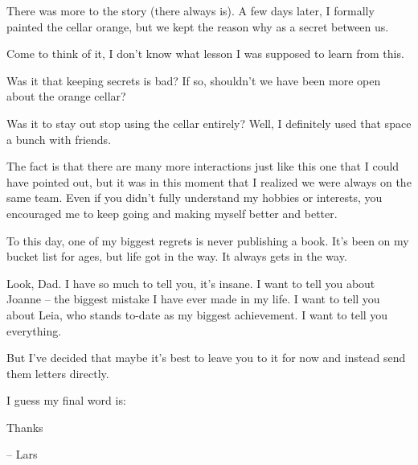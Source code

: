 There was more to the story (there always is).
A few days later, I formally painted the cellar orange, but we kept the reason why as a secret between us.

Come to think of it, I don't know what lesson I was supposed to learn from this.

Was it that keeping secrets is bad?
If so, shouldn't we have been more open about the orange cellar?

Was it to stay out stop using the cellar entirely?
Well, I definitely used that space a bunch with friends.

The fact is that there are many more interactions just like this one that I could have pointed out, but it was in this moment that I realized we were always on the same team.
Even if you didn't fully understand my hobbies or interests, you encouraged me to keep going and making myself better and better.

To this day, one of my biggest regrets is never publishing a book.
It's been on my bucket list for ages, but life got in the way.
It always gets in the way.

Look, Dad.
I have so much to tell you, it's insane.
I want to tell you about Joanne -- the biggest mistake I have ever made in my life.
I want to tell you about Leia, who stands to-date as my biggest achievement.
I want to tell you everything.

But I've decided that maybe it's best to leave you to it for now and instead send them letters directly.

I guess my final word is:

\huge{Thanks}

\normalsize{-- Lars}
